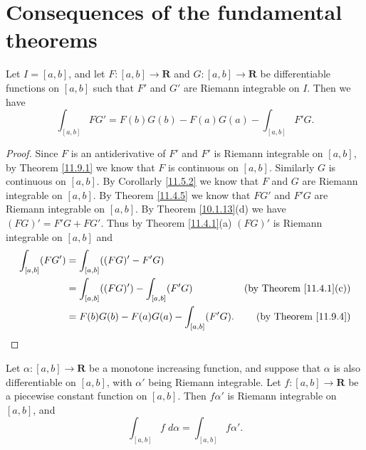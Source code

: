 \section{Consequences of the fundamental theorems}\label{sec 11.10}

\begin{proposition}\label{11.10.1}
    Let \(I = [a, b]\), and let \(F : [a, b] \to \mathbf{R}\) and \(G : [a, b] \to \mathbf{R}\) be differentiable functions on \([a, b]\) such that \(F'\) and \(G'\) are Riemann integrable on \(I\).
    Then we have
    \[
        \int_{[a, b]} F G' = F(b) G(b) - F(a) G(a) - \int_{[a, b]} F' G.
    \]
\end{proposition}

\begin{proof}
    Since \(F\) is an antiderivative of \(F'\) and \(F'\) is Riemann integrable on \([a, b]\), by Theorem \ref{11.9.1} we know that \(F\) is continuous on \([a, b]\).
    Similarly \(G\) is continuous on \([a, b]\).
    By Corollarly \ref{11.5.2} we know that \(F\) and \(G\) are Riemann integrable on \([a, b]\).
    By Theorem \ref{11.4.5} we know that \(F G'\) and \(F' G\) are Riemann integrable on \([a, b]\).
    By Theorem \ref{10.1.13}(d) we have \((FG)' = F' G + F G'\).
    Thus by Theorem \ref{11.4.1}(a) \((FG)'\) is Riemann integrable on \([a, b]\) and
    \begin{align*}
        \int_{[a, b]} (F G') & = \int_{[a, b]} ((FG)' - F' G)                                                        \\
                             & = \int_{[a, b]} ((FG)') - \int_{[a, b]} (F' G)  & \text{(by Theorem \ref{11.4.1}(c))} \\
                             & = F(b) G(b) - F(a) G(a) - \int_{[a, b]} (F' G). & \text{(by Theorem \ref{11.9.4})}
    \end{align*}
\end{proof}

\begin{theorem}\label{11.10.2}
    Let \(\alpha : [a, b] \to \mathbf{R}\) be a monotone increasing function, and suppose that \(\alpha\) is also differentiable on \([a, b]\), with \(\alpha'\) being Riemann integrable.
    Let \(f : [a, b] \to \mathbf{R}\) be a piecewise constant function on \([a, b]\).
    Then \(f \alpha'\) is Riemann integrable on \([a, b]\), and
    \[
        \int_{[a, b]} f \; d \alpha = \int_{[a, b]} f \alpha'.
    \]
\end{theorem}

